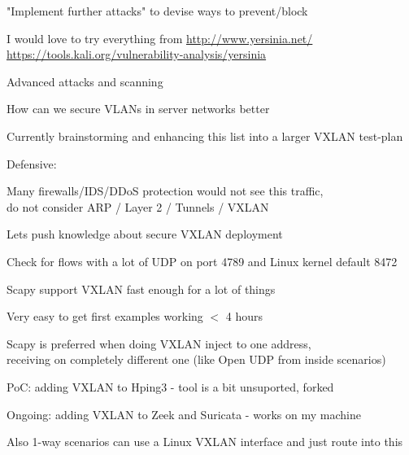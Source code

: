 \documentclass[Screen16to9,17pt]{foils}
\begin{document}


\begin{list2}
\item "Implement further attacks" to devise ways to prevent/block
\item I would love to try everything from  \url{http://www.yersinia.net/}\\ \url{https://tools.kali.org/vulnerability-analysis/yersinia}
\item Advanced attacks and scanning
\item How can we secure VLANs in server networks better
\item Currently brainstorming and enhancing this list into a larger VXLAN test-plan
\end{list2}



Defensive:
\begin{list2}
\item Many firewalls/IDS/DDoS protection would not see this traffic,\\
do not consider ARP / Layer 2 / Tunnels / VXLAN
\item Lets push knowledge about secure VXLAN deployment
\item Check for flows with a lot of UDP on port 4789 and Linux kernel default 8472
\end{list2}


\begin{list2}
\item Scapy support VXLAN fast enough for a lot of things
\item Very easy to get first examples working $<$ 4 hours
\item Scapy is preferred when doing VXLAN inject to one address, \\
receiving on completely different one (like Open UDP from inside scenarios)
\item PoC: adding VXLAN to Hping3 - tool is a bit unsuported, forked
\item Ongoing: adding VXLAN to Zeek and Suricata - works on my machine
\vskip 1cm
\item Also 1-way scenarios can use a Linux VXLAN interface and just route into this
\end{list2}
\end{document}
